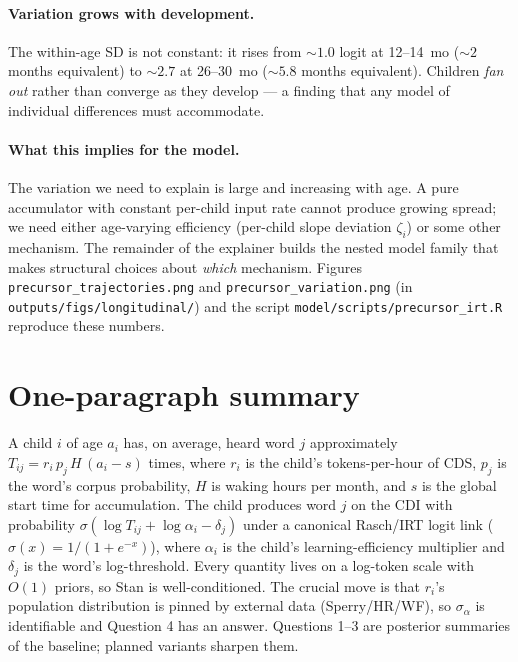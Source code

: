 \documentclass[11pt]{article}
\newcommand{\sigmoid}{\sigma}
\begin{document}
\paragraph{Variation grows with development.} The within-age SD is
not constant: it rises from \(\sim 1.0\) logit at 12--14~mo
(\(\sim 2\) months equivalent) to \(\sim 2.7\) at 26--30~mo
(\(\sim 5.8\) months equivalent). Children \emph{fan out} rather
than converge as they develop — a finding that any model of
individual differences must accommodate.

\paragraph{What this implies for the model.} The variation we need
to explain is large and increasing with age. A pure accumulator
with constant per-child input rate cannot produce growing spread; we
need either age-varying efficiency (per-child slope deviation
\(\zeta_i\)) or some other mechanism. The remainder of the
explainer builds the nested model family that makes structural
choices about \emph{which} mechanism. Figures
\texttt{precursor\_trajectories.png} and
\texttt{precursor\_variation.png} (in
\texttt{outputs/figs/longitudinal/}) and the script
\texttt{model/scripts/precursor\_irt.R} reproduce these numbers.

\section{One-paragraph summary}

A child \(i\) of age \(a_i\) has, on average, heard word \(j\) approximately
\(T_{ij} = r_i\,p_j\,H\,(a_i - s)\) times, where \(r_i\) is the child's
tokens-per-hour of CDS, \(p_j\) is the word's corpus probability, \(H\) is
waking hours per month, and \(s\) is the global start time for
accumulation. The child produces word \(j\) on the CDI with probability
\(\sigmoid(\log T_{ij} + \log \alpha_i - \delta_j)\) under a canonical
Rasch/IRT logit link (\(\sigmoid(x) = 1/(1+e^{-x})\)), where \(\alpha_i\)
is the child's learning-efficiency multiplier and \(\delta_j\) is the
word's log-threshold. Every quantity lives on a log-token scale with
\(O(1)\) priors, so Stan is well-conditioned. The crucial move is that
\(r_i\)'s population distribution is pinned by external data
(Sperry/HR/WF), so \(\sigma_\alpha\) is identifiable and Question 4 has an
answer. Questions 1--3 are posterior summaries of the baseline;
planned variants sharpen them.
\end{document}
